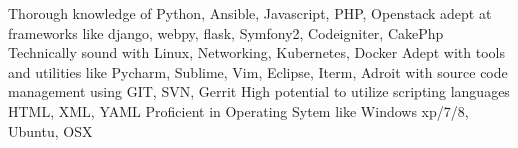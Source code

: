 
\begin{cvskills}
  \cvskill
    {Thorough knowledge of }
    {Python, Ansible, Javascript, PHP, Openstack}
  \cvskill
    {adept at frameworks like}
    {django, webpy, flask, Symfony2, Codeigniter, CakePhp}
  \cvskill
    {Technically sound with}
    {Linux, Networking, Kubernetes, Docker}
  \cvskill
    {Adept with tools and utilities like}
    {Pycharm, Sublime, Vim, Eclipse, Iterm, }
  \cvskill
    {Adroit with source code management using}
    {GIT, SVN, Gerrit}
  \cvskill
    {High potential to utilize scripting languages}
    {HTML, XML, YAML}
  \cvskill
  {Proficient in Operating Sytem like}
  {Windows xp/7/8, Ubuntu, OSX}
\end{cvskills}